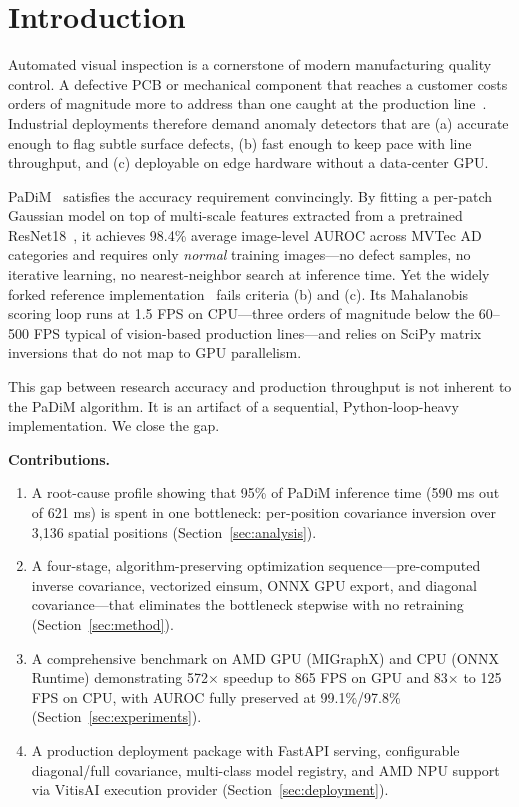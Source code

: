 \documentclass[blind]{gtac}
\begin{document}
\section{Introduction}
\label{sec:intro}

Automated visual inspection is a cornerstone of modern manufacturing quality
control.  A defective PCB or mechanical component that reaches a customer costs
orders of magnitude more to address than one caught at the production
line~\cite{bergmann2019mvtec}.  Industrial deployments therefore demand anomaly
detectors that are (a) accurate enough to flag subtle surface defects, (b) fast
enough to keep pace with line throughput, and (c) deployable on edge hardware
without a data-center GPU.

PaDiM~\cite{defard2021padim} satisfies the accuracy requirement convincingly.
By fitting a per-patch Gaussian model on top of multi-scale features extracted
from a pretrained ResNet18~\cite{he2016deep}, it achieves 98.4\% average
image-level AUROC across MVTec AD categories and requires only \emph{normal}
training images---no defect samples, no iterative learning, no nearest-neighbor
search at inference time.  Yet the widely forked reference
implementation~\cite{padim_repo} fails criteria (b) and (c).  Its Mahalanobis
scoring loop runs at 1.5 FPS on CPU---three orders of magnitude below the
60--500 FPS typical of vision-based production lines---and relies on SciPy
matrix inversions that do not map to GPU parallelism.

This gap between research accuracy and production throughput is not inherent to
the PaDiM algorithm.  It is an artifact of a sequential, Python-loop-heavy
implementation.  We close the gap.

\textbf{Contributions.}

\begin{enumerate}
  \item A root-cause profile showing that 95\% of PaDiM inference time
    (590 ms out of 621 ms) is spent in one bottleneck: per-position covariance
    inversion over 3{,}136 spatial positions
    (Section~\ref{sec:analysis}).

  \item A four-stage, algorithm-preserving optimization sequence---pre-computed
    inverse covariance, vectorized einsum, ONNX GPU export, and diagonal
    covariance---that eliminates the bottleneck stepwise with no retraining
    (Section~\ref{sec:method}).

  \item A comprehensive benchmark on AMD GPU (MIGraphX) and CPU (ONNX Runtime)
    demonstrating 572$\times$ speedup to 865 FPS on GPU and 83$\times$ to
    125 FPS on CPU, with AUROC fully preserved at 99.1\%/97.8\%
    (Section~\ref{sec:experiments}).

  \item A production deployment package with FastAPI serving, configurable
    diagonal/full covariance, multi-class model registry, and AMD NPU support
    via VitisAI execution provider (Section~\ref{sec:deployment}).
\end{enumerate}
\end{document}

